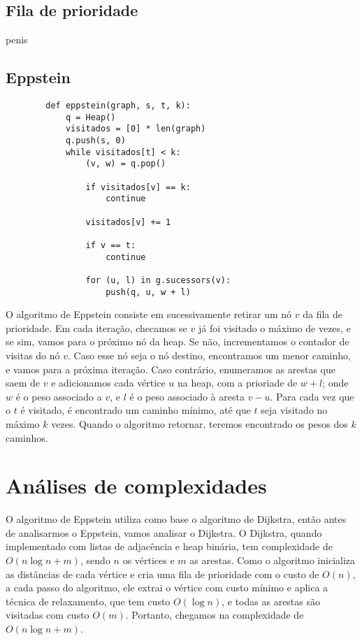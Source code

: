 \documentclass[12pt]{article}
\begin{document}
    \subsection{Fila de prioridade}
    penis

    \newpage
    \subsection{Eppstein}
    \begin{verbatim}
        def eppstein(graph, s, t, k):
            q = Heap()
            visitados = [0] * len(graph)
            q.push(s, 0)
            while visitados[t] < k:
                (v, w) = q.pop()

                if visitados[v] == k:
                    continue 

                visitados[v] += 1

                if v == t:
                    continue

                for (u, l) in g.sucessors(v):
                    push(q, u, w + l)
    \end{verbatim}
    O algoritmo de Eppstein consiste em sucessivamente retirar um nó $v$ da fila
    de prioridade. Em cada iteração, checamos se $v$ já foi visitado o máximo de
    vezes, e se sim, vamos para o próximo nó da heap. Se não, incrementamos o
    contador de visitas do nó $v$. Caso esse nó seja o nó destino, encontramos
    um menor caminho, e vamos para a próxima iteração. Caso contrário,
    enumeramos as arestas que saem de $v$ e adicionamos cada vértice $u$ na
    heap, com a prioriade de $w + l$; onde $w$ é o peso associado a $v$, e $l$ é
    o peso associado à aresta $v - u$. Para cada vez que o $t$ é visitado, é
    encontrado um caminho mínimo, até que $t$ seja visitado no máximo $k$ vezes.
    Quando o algoritmo retornar, teremos encontrado os pesos dos $k$ caminhos.



    \section{Análises de complexidades}
    O algoritmo de Eppstein utiliza como base o algoritmo de Dijkstra, então antes de analisarmos o Eppstein, vamos analisar o Dijkstra.
    O Dijkstra, quando implementado com listas de adjacência e heap binária, tem complexidade de $O(n\log n + m)$, sendo $n$ os vértices e $m$ as arestas. Como o algoritmo inicializa as distâncias de cada vértice e cria uma fila de prioridade com o custo de $O(n)$, a cada passo do algoritmo, ele extrai o vértice com custo mínimo e aplica a técnica de relaxamento, que tem custo $O(\log n)$, e todas as arestas são visitadas com custo $O(m)$. Portanto, chegamos na complexidade de $O(n\log n + m)$.
    
\end{document}
